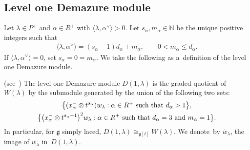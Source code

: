 \subsection{Level one Demazure module}\label{section3.2}

Let $\lambda\in P^{+}$ and $\alpha\in R^{+}$ with $\langle \lambda, \alpha^{\vee}\rangle > 0$.
Let $s_\alpha, m_\alpha \in \mathbb{N}$ be the unique positive integers such that
\begin{gather*}
\langle \lambda, \alpha^{\vee}\rangle = (s_\alpha-1)d_\alpha + m_\alpha,
\qquad
0<m_\alpha\leq d_\alpha.
\end{gather*}
If $\langle \lambda, \alpha^{\vee}\rangle = 0$, set $s_\alpha=0=m_\alpha$.
We take the following as a~def\/inition of the level one Demazure module.
\begin{definition}
\textup{(see~\cite[Corollary 3.5]{CV})} The level one Demazure module $D(1,\lambda)$ is the graded quotient of
$W(\lambda)$ by the submodule generated by the union of the following two sets:
\begin{gather}
\big\{(x^{-}_{\alpha} \otimes t^{s_{\alpha}})  w_{\lambda}: \alpha\in R^{+}~\textup{such that}~d_{\alpha} > 1\big\},
\label{dm1}
\\
\big\{\big(x^{-}_{\alpha} \otimes t^{s_{\alpha}-1}\big)^2  w_{\lambda}: \alpha\in R^{+}~\textup{such that}~d_\alpha =3~\textup{and}~m_\alpha=1\big\}.
\label{dm2}
\end{gather}
In particular, for $\mathfrak{g}$ simply laced, $D(1,\lambda)\cong_{\mathfrak{g}[t]} W(\lambda)$. We denote~by
$\overline{w}_\lambda$, the image of $w_\lambda$ in~$D(1,\lambda)$.
\end{definition}

